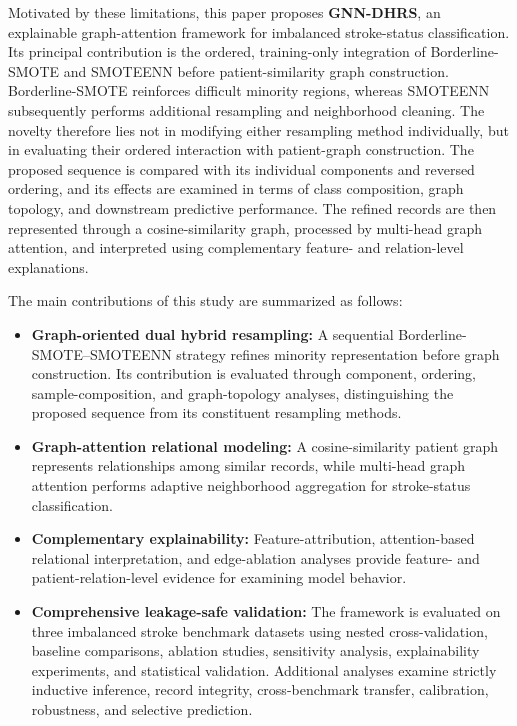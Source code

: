 \documentclass[pdflatex,sn-mathphys-num]{sn-jnl}%
\theoremstyle{thmstyleone}%
\theoremstyle{thmstyletwo}%
\theoremstyle{thmstylethree}%
\begin{document}
 {
Motivated by these limitations, this paper proposes \textbf{GNN-DHRS}, an
explainable graph-attention framework for imbalanced stroke-status
classification. Its principal contribution is the ordered, training-only
integration of Borderline-SMOTE and SMOTEENN before patient-similarity graph
construction. Borderline-SMOTE reinforces difficult minority regions, whereas
SMOTEENN subsequently performs additional resampling and neighborhood
cleaning. The novelty therefore lies not in modifying either resampling method
individually, but in evaluating their ordered interaction with patient-graph
construction. The proposed sequence is compared with its individual
components and reversed ordering, and its effects are examined in terms of
class composition, graph topology, and downstream predictive performance.
The refined records are then represented through a cosine-similarity graph,
processed by multi-head graph attention, and interpreted using complementary
feature- and relation-level explanations.
}

The main contributions of this study are summarized as follows:

\begin{itemize}

\item \textbf{Graph-oriented dual hybrid resampling:}
A sequential Borderline-SMOTE--SMOTEENN strategy refines minority
representation before graph construction.
 {
Its contribution is evaluated through component, ordering, sample-composition,
and graph-topology analyses, distinguishing the proposed sequence from its
constituent resampling methods.
}

\item \textbf{Graph-attention relational modeling:}
A cosine-similarity patient graph represents relationships among similar
records, while multi-head graph attention performs adaptive neighborhood
aggregation for stroke-status classification.

\item \textbf{Complementary explainability:}
Feature-attribution, attention-based relational interpretation, and
edge-ablation analyses provide feature- and patient-relation-level evidence
for examining model behavior.

\item \textbf{Comprehensive leakage-safe validation:}
The framework is evaluated on three imbalanced stroke benchmark datasets
using nested cross-validation, baseline comparisons, ablation studies,
sensitivity analysis, explainability experiments, and statistical validation.
 {
Additional analyses examine strictly inductive inference, record integrity,
cross-benchmark transfer, calibration, robustness, and selective prediction.
}

\end{itemize}
\end{document}
